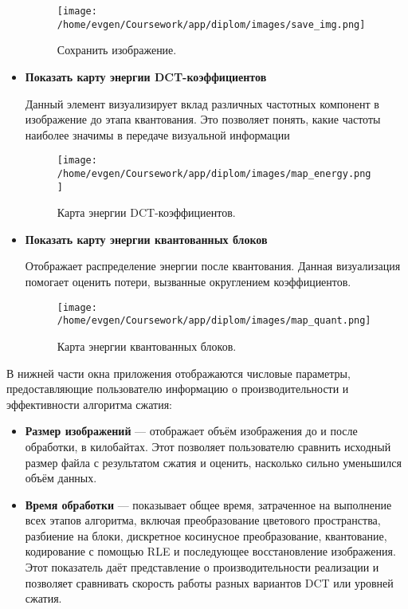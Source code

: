 \begin{itemize}
    \begin{figure}[h!]
        \centering
        \texttt{[image: /home/evgen/Coursework/app/diplom/images/save\_img.png]}
        \caption{Сохранить изображение.}
        \label{fig:save_img}
    \end{figure}


    \FloatBarrier
    \item \textbf{Показать карту энергии DCT-коэффициентов}
    
    Данный элемент визуализирует вклад различных частотных компонент в изображение до этапа квантования. 
    Это позволяет понять, какие частоты наиболее значимы в передаче визуальной информации


    \begin{figure}[h!]
        \centering
        \texttt{[image: /home/evgen/Coursework/app/diplom/images/map\_energy.png]}
        \caption{Карта энергии DCT-коэффициентов.}
        \label{fig:map_energy}
    \end{figure}


    \FloatBarrier

    \item \textbf{Показать карту энергии квантованных блоков} 

    Отображает распределение энергии после квантования. 
    Данная визуализация помогает оценить потери, вызванные округлением коэффициентов.

    \begin{figure}[h!]
        \centering
        \texttt{[image: /home/evgen/Coursework/app/diplom/images/map\_quant.png]}
        \caption{Карта энергии квантованных блоков.}
        \label{fig:map_quant}
    \end{figure}

\end{itemize}

\FloatBarrier
В нижней части окна приложения отображаются числовые параметры, 
предоставляющие пользователю информацию о производительности и эффективности алгоритма сжатия:
\begin{itemize}
    \item \textbf{Размер изображений} — отображает объём изображения до и после обработки, в килобайтах. 
    Этот позволяет пользователю сравнить исходный размер файла с результатом сжатия и оценить, 
    насколько сильно уменьшился объём данных.

    \item \textbf{Время обработки} — показывает общее время, затраченное на выполнение всех этапов алгоритма, 
    включая преобразование цветового пространства, разбиение на блоки, дискретное косинусное преобразование, 
    квантование, кодирование с помощью RLE и последующее восстановление изображения. 
    Этот показатель даёт представление о производительности реализации и позволяет сравнивать 
    скорость работы разных вариантов DCT или уровней сжатия.
\end{itemize}


